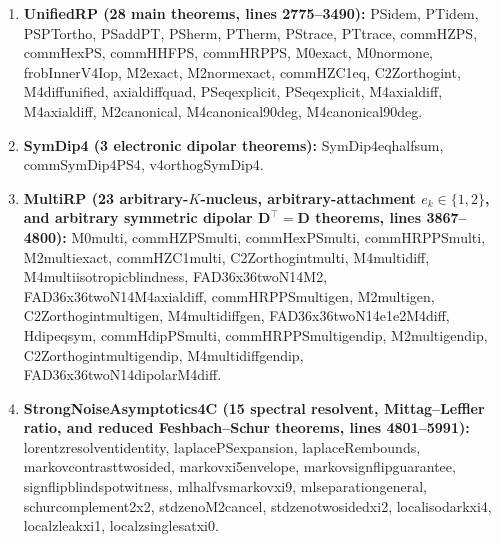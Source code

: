 \documentclass[onecolumn,10pt,notitlepage,amsmath,amssymb,floatfix]{revtex4-2}
\theoremstyle{plain}
\theoremstyle{definition}
\newcommand{\leanid}[1]{{\footnotesize\ttfamily\def\_{\textunderscore\allowbreak}#1}}
\begin{document}
\begin{enumerate}[leftmargin=1.8em,itemsep=2pt]
\item \textbf{\leanid{UnifiedRP} (28 main theorems, lines 2775--3490):} \leanid{PS\_idem}, \leanid{PT\_idem}, \leanid{PS\_PT\_ortho}, \leanid{PS\_add\_PT}, \leanid{PS\_herm}, \leanid{PT\_herm}, \leanid{PS\_trace}, \leanid{PT\_trace}, \leanid{comm\_H\_Z\_PS}, \leanid{comm\_H\_ex\_PS}, \leanid{comm\_H\_HF\_PS}, \leanid{comm\_H\_RP\_PS}, \leanid{M0\_exact}, \leanid{M0\_norm\_one}, \leanid{frobInner\_V4\_Iop}, \leanid{M2\_exact}, \leanid{M2\_norm\_exact}, \leanid{comm\_HZ\_C1\_eq}, \leanid{C2\_Z\_orthog\_int}, \leanid{M4\_diff\_unified}, \leanid{axial\_diff\_quad}, \leanid{PS\_8\_eq\_explicit}, \leanid{PS\_12\_eq\_explicit}, \leanid{M4\_8\_axial\_diff}, \leanid{M4\_12\_axial\_diff}, \leanid{M2\_8\_canonical}, \leanid{M4\_8\_canonical\_90deg}, \leanid{M4\_12\_canonical\_90deg}.
\item \textbf{\leanid{SymDip4} (3 electronic dipolar theorems):} \leanid{SymDip4\_eq\_half\_sum}, \leanid{comm\_SymDip4\_PS4}, \leanid{v4\_orthog\_SymDip4}.
\item \textbf{\leanid{MultiRP} (23 arbitrary-$K$-nucleus, arbitrary-attachment $e_k\in\{1,2\}$, and arbitrary symmetric dipolar $\mathbf{D}^\top=\mathbf{D}$ theorems, lines 3867--4800):} \leanid{M0\_multi}, \leanid{comm\_H\_Z\_PS\_multi}, \leanid{comm\_H\_ex\_PS\_multi}, \leanid{comm\_H\_RP\_PS\_multi}, \leanid{M2\_multi\_exact}, \leanid{comm\_HZ\_C1\_multi}, \leanid{C2\_Z\_orthog\_int\_multi}, \leanid{M4\_multi\_diff}, \leanid{M4\_multi\_isotropic\_blindness}, \leanid{FAD\_36x36\_twoN14\_M2}, \leanid{FAD\_36x36\_twoN14\_M4\_axial\_diff}, \leanid{comm\_H\_RP\_PS\_multi\_gen}, \leanid{M2\_multi\_gen}, \leanid{C2\_Z\_orthog\_int\_multi\_gen}, \leanid{M4\_multi\_diff\_gen}, \leanid{FAD\_36x36\_twoN14\_e1e2\_M4\_diff}, \leanid{H\_dip\_eq\_sym}, \leanid{comm\_H\_dip\_PS\_multi}, \leanid{comm\_H\_RP\_PS\_multi\_gen\_dip}, \leanid{M2\_multi\_gen\_dip}, \leanid{C2\_Z\_orthog\_int\_multi\_gen\_dip}, \leanid{M4\_multi\_diff\_gen\_dip}, \leanid{FAD\_36x36\_twoN14\_dipolar\_M4\_diff}.
\item \textbf{\leanid{StrongNoiseAsymptotics4C} (15 spectral resolvent, Mittag--Leffler ratio, and reduced Feshbach--Schur theorems, lines 4801--5991):} \leanid{lorentz\_resolvent\_identity}, \leanid{laplacePS\_expansion}, \leanid{laplaceRem\_bounds}, \leanid{markov\_contrast\_two\_sided}, \leanid{markov\_xi5\_envelope}, \leanid{markov\_sign\_flip\_guarantee}, \leanid{sign\_flip\_blind\_spot\_witness}, \leanid{ml\_half\_vs\_markov\_xi9\_2}, \leanid{ml\_separation\_general}, \leanid{schur\_complement\_2x2}, \leanid{std\_zeno\_M2\_cancel}, \leanid{std\_zeno\_two\_sided\_xi2}, \leanid{local\_iso\_dark\_xi4}, \leanid{local\_z\_leak\_xi1}, \leanid{local\_z\_single\_sat\_xi0}.
\end{enumerate}
\end{document}
